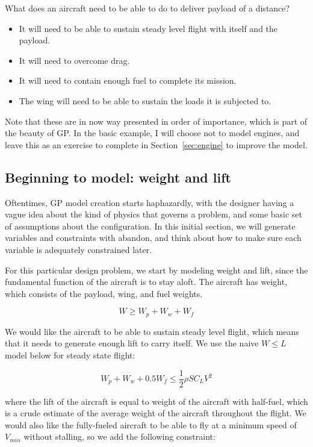 What does an aircraft need to be able to do to deliver payload of a distance?
\begin{itemize}
	\item It will need to be able to sustain steady
    level flight with itself and the payload.
    \item It will need to overcome drag.
	\item It will need to contain enough fuel to complete its mission.
	\item The wing will need to be able to sustain the loads it is
    subjected to.
\end{itemize}

Note that these are in now way presented in order of importance, which is part of
the beauty of \gls{GP}. In the basic example, I will choose not to model engines,
and leave this as an exercise
to complete in Section~\ref{sec:engine} to improve the model.

\subsection{Beginning to model: weight and lift}

Oftentimes, GP model creation starts haphazardly, with the designer having a
vague idea about the kind of physics that governs a problem, and some basic
set of assumptions about the configuration. In this initial section, we will
generate variables and constraints with abandon, and think about how to make
sure each variable is adequately constrained later.

For this particular design problem, we start by modeling
weight and lift, since the fundamental function of the aircraft is to stay aloft.
The aircraft has weight, which consists of the payload, wing, and fuel weights. 

\begin{equation}
    W \geq W_p + W_w + W_f
\end{equation}

We would like the aircraft to be able to sustain steady level flight, which means 
that it needs to generate enough lift to carry itself. We use the naive $W \leq L$ 
model below for steady state flight:

\begin{equation}
    W_p + W_w + 0.5 W_f \leq \frac{1}{2} \rho S C_L V^2
\end{equation}

where the lift of the aircraft is equal to weight of the aircraft with half-fuel, 
which is a crude estimate of the average weight of the aircraft throughout the flight. 
We would also like the fully-fueled aircraft to be able to fly at a minimum speed 
of $V_{min}$ without stalling, so we add the following constraint:

